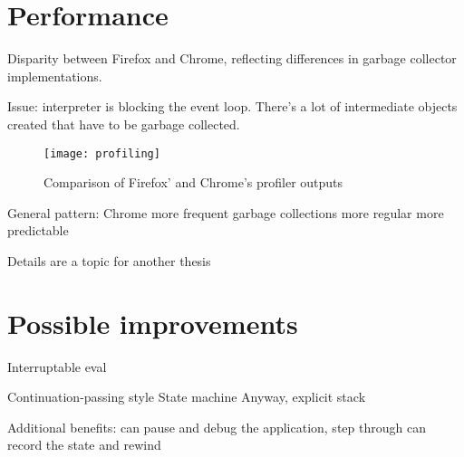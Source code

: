 \section{Performance}
Disparity between Firefox and Chrome, reflecting differences in garbage
collector implementations.

Issue: interpreter is blocking the event loop.  There's a lot of intermediate
objects created that have to be garbage collected.

\begin{figure}[h!]
	\centering \texttt{[image: profiling]}
	\caption{Comparison of Firefox' and Chrome's profiler outputs}
	\label{fig:profiling}
\end{figure}

General pattern: Chrome more frequent garbage collections more regular more
predictable

Details are a topic for another thesis

\section{Possible improvements}
Interruptable eval

Continuation-passing style State machine Anyway, explicit stack

Additional benefits: can pause and debug the application, step through can
record the state and rewind
